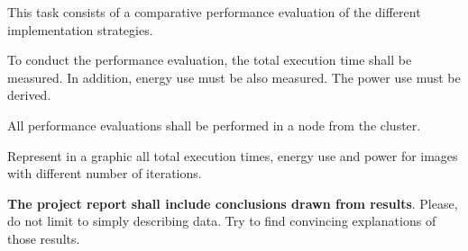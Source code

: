 This task consists of a comparative performance evaluation of the 
different implementation strategies.

To conduct the performance evaluation, the total execution time shall be measured.
In addition, energy use must be also measured.
The power use must be derived.

All performance evaluations shall be performed in a node from the
 cluster.

Represent in a graphic all total execution times, energy use and power
for images with different number of iterations.

\textbf{The project report shall include conclusions drawn from results}.
Please, do not limit to simply describing data.
Try to find convincing explanations of those results.

